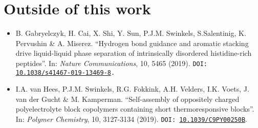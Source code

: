 \clearpage

\section*{Outside of this work}
{ \small
\begin{itemize}
	\item B. Gabryelczyk, H. Cai, X. Shi, Y. Sun, P.J.M. Swinkels, S.Salentinig, K. Pervushin \& A. Miserez. ``Hydrogen bond guidance and aromatic stacking drive li\-quid\--li\-quid phase separation of intrinsically disordered histidine-rich peptides''. In: \textit{Nature Communications}, 10, 5465 (2019). \texttt{DOI: \href{https://doi.org/10.1038/s41467-019-13469-8}{10.1038/s41467-019-13469-8}\allowbreak.}
	\item  I.A. van Hees, P.J.M. Swinkels, R.G. Fokkink, A.H. Velders, I.K. Voets, J. van der Gucht \& M. Kamperman. ``Self-assembly of oppositely charged polyelectrolyte block copolymers containing short ther\-mo\-re\-spon\-si\-ve blo\-cks''. In: \textit{Polymer Chemistry}, 10, 3127-3134 (2019). \texttt{DOI: \href{https://doi.org/10.1039/C9PY00250B}{10.1039/C9PY00250B}\allowbreak}.
\end{itemize}
}

\nocite{swinkelsRevealingPseudorotationRingopening2021,heesSelfassemblyOppositelyCharged2019,gabryelczykHydrogenBondGuidance2019}